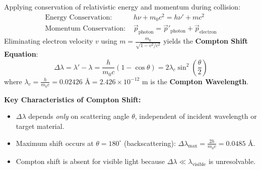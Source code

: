 \documentclass[12pt,a4paper]{article}
\begin{document}
\begin{tcolorbox}[formulabox, title={\textbf{Derivation of Compton Shift Formula}}]
Applying conservation of relativistic energy and momentum during collision:
\begin{align}
\text{Energy Conservation: } & h\nu + m_0 c^2 = h\nu' + m c^2 \\[4pt]
\text{Momentum Conservation: } & \vec{p}_{\text{photon}} = \vec{p}'_{\text{photon}} + \vec{p}_{\text{electron}}
\end{align}
Eliminating electron velocity $v$ using $m = \frac{m_0}{\sqrt{1 - v^2/c^2}}$ yields the \textbf{Compton Shift Equation}:
\begin{equation}
\Delta \lambda = \lambda' - \lambda = \frac{h}{m_0 c} (1 - \cos\theta) = 2 \lambda_c \sin^2\left(\frac{\theta}{2}\right)
\end{equation}
where $\lambda_c = \frac{h}{m_0 c} = 0.02426\text{ \AA} = 2.426 \times 10^{-12}\text{ m}$ is the \textbf{Compton Wavelength}.
\end{tcolorbox}

\textbf{Key Characteristics of Compton Shift:}
\begin{itemize}[leftmargin=*, itemsep=2pt]
  \item $\Delta \lambda$ depends \textit{only} on scattering angle $\theta$, independent of incident wavelength or target material.
  \item Maximum shift occurs at $\theta = 180^\circ$ (backscattering): $\Delta \lambda_{\max} = \frac{2h}{m_0 c} = 0.0485\text{ \AA}$.
  \item Compton shift is absent for visible light because $\Delta\lambda \ll \lambda_{\text{visible}}$ is unresolvable.
\end{itemize}
\end{document}
